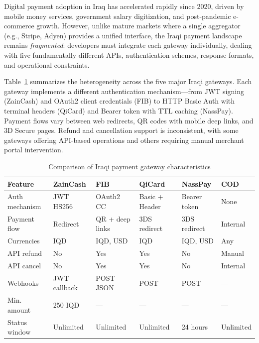 \documentclass[preprint,12pt]{elsarticle}
\begin{document}
Digital payment adoption in Iraq has accelerated rapidly since 2020, driven by mobile money services, government salary digitization, and post-pandemic e-commerce growth. However, unlike mature markets where a single aggregator (e.g., Stripe, Adyen) provides a unified interface, the Iraqi payment landscape remains \emph{fragmented}: developers must integrate each gateway individually, dealing with five fundamentally different APIs, authentication schemes, response formats, and operational constraints.

Table~\ref{tab:gateway-comparison} summarizes the heterogeneity across the five major Iraqi gateways. Each gateway implements a different authentication mechanism---from JWT signing (ZainCash) and OAuth2 client credentials (FIB) to HTTP Basic Auth with terminal headers (QiCard) and Bearer token with TTL caching (NassPay). Payment flows vary between web redirects, QR codes with mobile deep links, and 3D Secure pages. Refund and cancellation support is inconsistent, with some gateways offering API-based operations and others requiring manual merchant portal intervention.

\begin{table}[!t]
\centering
\caption{Comparison of Iraqi payment gateway characteristics}
\label{tab:gateway-comparison}
\small
\begin{tabular}{@{}llllll@{}}
\toprule
\textbf{Feature} & \textbf{ZainCash} & \textbf{FIB} & \textbf{QiCard} & \textbf{NassPay} & \textbf{COD} \\
\midrule
Auth mechanism & JWT HS256 & OAuth2 CC & Basic + Header & Bearer token & None \\
Payment flow & Redirect & QR + deep links & 3DS redirect & 3DS redirect & Internal \\
Currencies & IQD & IQD, USD & IQD & IQD, USD & Any \\
API refund & No & Yes & Yes & No & Manual \\
API cancel & No & Yes & Yes & No & Internal \\
Webhooks & JWT callback & POST JSON & POST & POST & --- \\
Min. amount & 250 IQD & --- & --- & --- & --- \\
Status window & Unlimited & Unlimited & Unlimited & 24 hours & Unlimited \\
\bottomrule
\end{tabular}
\end{table}
\end{document}
